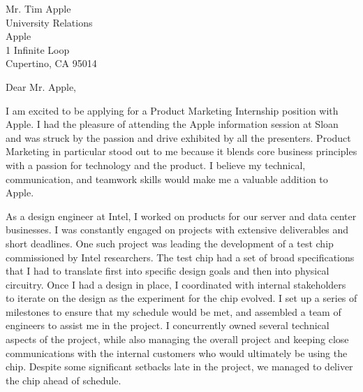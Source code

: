 \documentclass[a4paper,11pt,letter]{business}
\begin{document}


\thispagestyle{text}


\vspace{\dimexpr 10mm-\baselineskip\relax}

Mr. Tim Apple\\
University Relations\\
Apple\\
1 Infinite Loop\\
Cupertino, CA 95014

Dear Mr. Apple,


I am excited to be applying for a Product Marketing Internship position with Apple.
I had the pleasure of attending the Apple information session at Sloan and was struck by the passion and drive exhibited by all the presenters.
Product Marketing in particular stood out to me because it blends core business principles with a passion for technology and the product.
I believe my technical, communication, and teamwork skills would make me a valuable addition to Apple.


As a design engineer at Intel, I worked on products for our server and data center businesses.
I was constantly engaged on projects with extensive deliverables and short deadlines.
One such project was leading the development of a test chip commissioned by Intel researchers.
The test chip had a set of broad specifications that I had to translate first into specific design goals and then into physical circuitry.
Once I had a design in place, I coordinated with internal stakeholders to iterate on the design as the experiment for the chip evolved.
I set up a series of milestones to ensure that my schedule would be met, and assembled a team of engineers to assist me in the project.
I concurrently owned several technical aspects of the project, while also managing the overall project and keeping close communications with the internal customers who would ultimately be using the chip.
Despite some significant setbacks late in the project, we managed to deliver the chip ahead of schedule.
\end{document}
